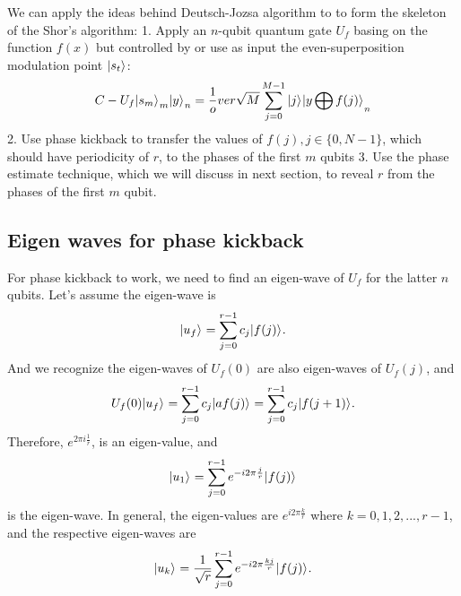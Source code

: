 \documentclass[oneside, letter, 12pt]{book}
\begin{document}
We can apply the ideas behind Deutsch-Jozsa algorithm to to form the skeleton of the Shor's algorithm:
1. Apply an $n$-qubit quantum gate $U_f$ basing on the function $f(x)$ but controlled by or use as input the even-superposition modulation point $\vert {s_t} \rangle_{}$:
\begin{equation}
    C-U_f{\vert {s_m} \rangle_{}}_m {\vert {y} \rangle_{}}_n = \frac 1 over \sqrt {M} \sum^{M-1}_{j=0} \vert {j} \rangle_{} {\vert {y\bigoplus f(j)} \rangle_{}}_n
\end{equation}
2. Use phase kickback to transfer the values of $f(j), j\in \{0,N-1\}$, which should have periodicity of $r$, to the phases of the first $m$ qubits
3. Use the phase estimate technique, which we will discuss in next section, to reveal $r$ from the phases of the first $m$ qubit.

\subsection{Eigen waves for phase kickback}
For phase kickback to work, we need to find an eigen-wave of $U_f$ for the latter $n$ qubits. Let's assume the eigen-wave is
\begin{equation}\label{keta_u}
    \vert {u_f} \rangle_{} = \sum^{r-1}_{j=0} c_j \vert {f(j)} \rangle_{}.
\end{equation}
And we recognize the eigen-waves of $U_f(0)$ are also eigen-waves of $U_f(j)$, and
\begin{equation}\label{Uketa_u}
U_f(0) \vert {u_f} \rangle_{} = \sum^{r-1}_{j=0} c_j \vert {a f(j)} \rangle_{}= \sum^{r-1}_{j=0} c_j \vert { f(j+1)} \rangle_{}.
\end{equation}
Therefore, $e^{2\pi i \frac 1 r}$, is an eigen-value, and
\begin{equation}\label{keta_u1}
    \vert {u_1} \rangle_{} = \sum^{r-1}_{j=0} e^{-i 2\pi \frac j r} \vert {f(j)} \rangle_{}
\end{equation}
is the eigen-wave.
In general, the eigen-values are $e^{i 2\pi \frac k r}$ where $k=0, 1, 2, ..., r-1$, and the respective eigen-waves are
\begin{equation}\label{keta_uk}
    \vert {u_k} \rangle_{} = \frac 1 {\sqrt{r}} \sum^{r-1}_{j=0} e^{-i 2\pi \frac {kj} r} \vert {f(j)} \rangle_{}.
\end{equation}
\end{document}
